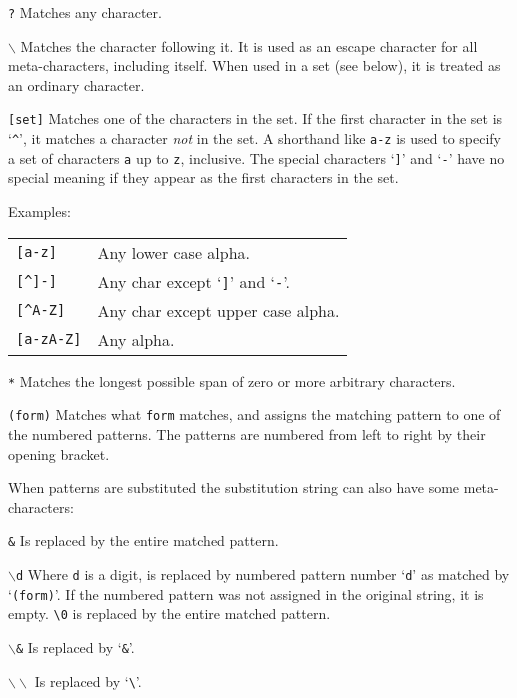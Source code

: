 \begin{desctab}
\item[\texttt{?}]
Matches any character.

\item[\texttt{$\backslash$}]
Matches the character following it.
It is used as an escape character for all
meta-characters, including itself. When used
in a set (see below), it is treated as an ordinary character.

\item[\texttt{[set]}]
Matches one of the characters in the set.
If the first character in the set is `\verb!^!',
it matches a character \emph{not} in the set. A shorthand like
\verb!a-z! is used to specify a set of
characters \verb!a! up to \verb!z!, inclusive. The special
characters `\verb!]!' and `\verb!-!' have no special
meaning if they appear as the first characters in the set.

Examples:

\begin{tabular}{ll}
\verb![a-z]! & Any lower case alpha. \\
\verb![^]-]! & Any char except `\verb!]!' and `\verb!-!'. \\
\verb![^A-Z]! & Any char except upper case alpha. \\
\verb![a-zA-Z]! & Any alpha.
\end{tabular}

\item[\texttt{*}]
Matches the longest possible span of zero or more arbitrary characters.

\item[\texttt{(form)}]
Matches what \texttt{form} matches,
and assigns the matching pattern to one of the numbered patterns.
The patterns are numbered from left to right by their opening bracket.
\end{desctab}

When patterns are substituted the substitution string can also have
some meta-characters:

\begin{desctab}

\item[\texttt{\&}]
Is replaced by the entire matched pattern.

\item[\texttt{$\backslash$d}]
Where \verb'd' is a digit,
is replaced by numbered pattern number `\texttt{d}' as matched by
`\texttt{(form)}'.
If the numbered pattern was not assigned in the original string,
it is empty. \verb!\0! is replaced by the entire matched pattern.

\item[\texttt{$\backslash$\&}]
Is replaced by `\verb!&!'.

\item[\texttt{$\backslash\backslash$}]
Is replaced by `\verb!\!'.
\end{desctab}

